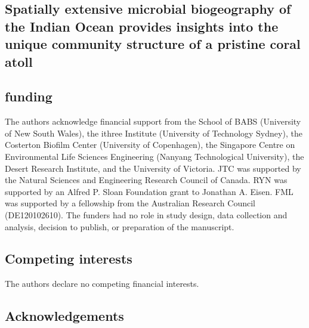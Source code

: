 \begin{refsection}

\chapter{Spatially extensive microbial biogeography of the Indian Ocean provides insights into the unique community structure of a pristine coral atoll}






\section{funding}

The authors acknowledge financial support from the School of BABS (University of New South Wales), the ithree Institute (University of Technology Sydney), the Costerton Biofilm Center (University of Copenhagen), the Singapore Centre on Environmental Life Sciences Engineering (Nanyang Technological University), the Desert Research Institute, and the University of Victoria. JTC was supported by the Natural Sciences and Engineering Research Council of Canada. RYN was supported by an Alfred P. Sloan Foundation grant to Jonathan A. Eisen. FML was supported by a fellowship from the Australian Research Council (DE120102610). The funders had no role in study design, data collection and analysis, decision to publish, or preparation of the manuscript.

\section{Competing interests}

The authors declare no competing financial interests.

\section{Acknowledgements}


\end{refsection}
